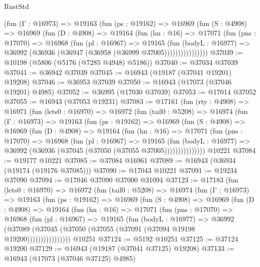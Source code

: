 \begin{lexlean}{RustStd}
\begin{coremodule}
            (fun (Γ : @16973) =>
            @19163
              (fun (ps : @19162) =>
              @16969
                (fun (S : @4908) =>
                @16969
                  (fun (D : @4908) =>
                  @19164
                    (fun (hn : @16) =>
                    @17071
                      (fun (pns : @17070) =>
                      @16968
                        (fun (pl : @16967) =>
                        @19165
                          (fun (bodyL : @16977) =>
                          @36992 (@36936 (@36947 (@36958 (@36999 @37005))))))))))))))))
@37039 := @10198 (@5806 (@5176 (@7285 @4948) @5186))
@37040 := @37034 @37039
@37041 := @36942 @37039
@37045 := @16943 (@19187 (@37041 @19201) @19208)
@37046 := @36953 @37039
@37050 := @16943 (@17073 (@37046 @19201) @4985)
@37052 := @36995 (@17030 @37039)
@37053 := @17014 @37052
@37055 := @16943 (@37053 @19231)
@37083 := @17161
    (fun (rty : @4908) =>
    @16971
      (fun (lets0 : @16970) =>
      @16972
        (fun (tail0 : @5208) =>
        @16974
          (fun (Γ : @16973) =>
          @19163
            (fun (ps : @19162) =>
            @16969
              (fun (S : @4908) =>
              @16969
                (fun (D : @4908) =>
                @19164
                  (fun (hn : @16) =>
                  @17071
                    (fun (pns : @17070) =>
                    @16968
                      (fun (pl : @16967) =>
                      @19165
                        (fun (bodyL : @16977) =>
                        @36992 (@36936 (@37045 (@37050 (@37055 @37005)))))))))))))))
    @10221
@37084 := @19177 @10221
@37085 := @37084 @16961
@37089 := @16943 (@36934 (@19174 (@19176 @37085)))
@37090 := @17043 @10221
@37091 := @19234 @37090
@37094 := @17046 @37090 @37000 @31094
@37123 := @17183
    (fun (lets0 : @16970) =>
    @16972
      (fun (tail0 : @5208) =>
      @16974
        (fun (Γ : @16973) =>
        @19163
          (fun (ps : @19162) =>
          @16969
            (fun (S : @4908) =>
            @16969
              (fun (D : @4908) =>
              @19164
                (fun (hn : @16) =>
                @17071
                  (fun (pns : @17070) =>
                  @16968
                    (fun (pl : @16967) =>
                    @19165
                      (fun (bodyL : @16977) =>
                      @36992
                        (@37089
                          (@37045 (@37050 (@37055 (@37091 (@37094 @19198 @19200))))))))))))))))
    @10251
@37124 := @5192 @10251
@37125 := @37124 @19200
@37129 := @16943 (@19187 (@37041 @37125) @19208)
@37133 := @16943 (@17073 (@37046 @37125) @4985)

\end{coremodule}
\end{lexlean}

